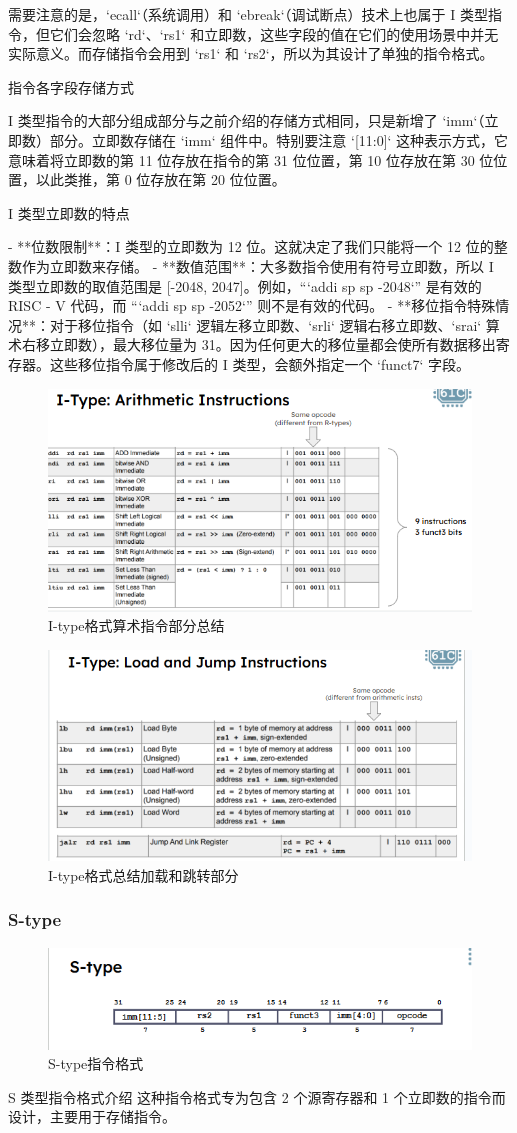 \documentclass{ctexart}
\begin{document}
需要注意的是，`ecall`（系统调用）和 `ebreak`（调试断点）技术上也属于 I 类型指令，但它们会忽略 `rd`、`rs1` 和立即数，这些字段的值在它们的使用场景中并无实际意义。而存储指令会用到 `rs1` 和 `rs2`，所以为其设计了单独的指令格式。

 指令各字段存储方式\par
I 类型指令的大部分组成部分与之前介绍的存储方式相同，只是新增了 `imm`（立即数）部分。立即数存储在 `imm` 组件中。特别要注意 `[11:0]` 这种表示方式，它意味着将立即数的第 11 位存放在指令的第 31 位位置，第 10 位存放在第 30 位位置，以此类推，第 0 位存放在第 20 位位置。\par

 I 类型立即数的特点\par
- **位数限制**：I 类型的立即数为 12 位。这就决定了我们只能将一个 12 位的整数作为立即数来存储。
- **数值范围**：大多数指令使用有符号立即数，所以 I 类型立即数的取值范围是 [-2048, 2047]。例如，“`addi sp sp -2048`” 是有效的 RISC - V 代码，而 “`addi sp sp -2052`” 则不是有效的代码。
- **移位指令特殊情况**：对于移位指令（如 `slli` 逻辑左移立即数、`srli` 逻辑右移立即数、`srai` 算术右移立即数），最大移位量为 31。因为任何更大的移位量都会使所有数据移出寄存器。这些移位指令属于修改后的 I 类型，会额外指定一个 `funct7` 字段。 \par
\begin{figure}
    \centering
    \includegraphics[width=0.5\linewidth]{I-type格式总结.png}
    \caption{I-type格式算术指令部分总结}
    \label{fig:enter-label}
\end{figure}
\begin{figure}
    \centering
    \includegraphics[width=0.5\linewidth]{I-type格式总结加载和跳转部分.png}
    \caption{I-type格式总结加载和跳转部分}
    \label{fig:enter-label}
\end{figure}
\subsubsection{S-type}
\begin{figure}
    \centering
    \includegraphics[width=0.5\linewidth]{S-type指令格式.png}
    \caption{S-type指令格式}
    \label{fig:enter-label}
\end{figure}
 S 类型指令格式介绍
这种指令格式专为包含 2 个源寄存器和 1 个立即数的指令而设计，主要用于存储指令。
\end{document}
